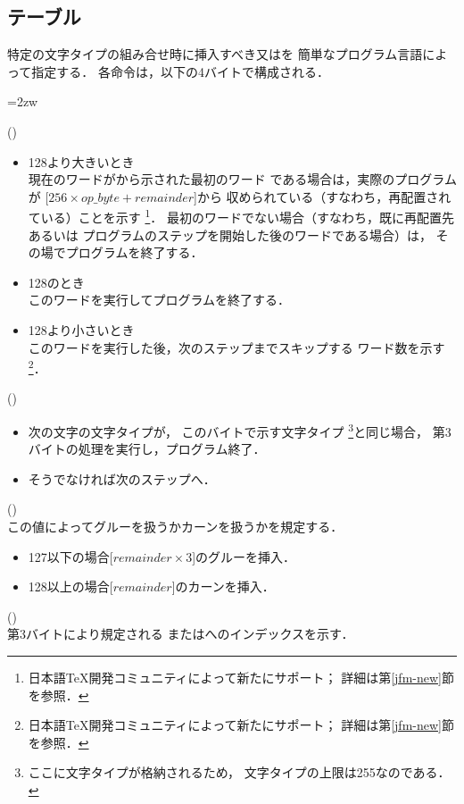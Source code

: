 \documentclass[a4paper,11pt,nomag]{jsarticle}
\def\size#1{\mathit{#1}}
\begin{document}

\subsection{テーブル}
特定の文字タイプの組み合せ時に挿入すべき又はを
簡単なプログラム言語によって指定する．
各命令は，以下の4バイトで構成される．
\begin{description}\itemindent=2zw
\item[第1バイト] ()
  \begin{itemize}
  \item 128より大きいとき\\
    現在のワードがから示された最初のワード
    である場合は，実際のプログラムが
    [$256\times\size{op\_byte}+\size{remainder}$]から
    収められている（すなわち，再配置されている）ことを示す
    \footnote{日本語\TeX{}開発コミュニティによって新たにサポート；
    詳細は第\ref{jfm-new}節を参照．}．
    最初のワードでない場合（すなわち，既に再配置先あるいは
    プログラムのステップを開始した後のワードである場合）は，
    その場でプログラムを終了する．
  \item 128のとき\\
    このワードを実行してプログラムを終了する．
  \item 128より小さいとき\\
    このワードを実行した後，次のステップまでスキップする
    ワード数を示す
    \footnote{日本語\TeX{}開発コミュニティによって新たにサポート；
    詳細は第\ref{jfm-new}節を参照．}．
  \end{itemize}
\item[第2バイト] ()
  \begin{itemize}
  \item 次の文字の文字タイプが，
    このバイトで示す文字タイプ
    \footnote{ここに文字タイプが格納されるため，
    文字タイプの上限は255なのである．}と同じ場合，
    第3バイトの処理を実行し，プログラム終了．
  \item そうでなければ次のステップへ．
  \end{itemize}
\item[第3バイト] ()\\
  この値によってグルーを扱うかカーンを扱うかを規定する．
  \begin{itemize}
  \item 127以下の場合[$\size{remainder}\times 3$]のグルーを挿入．
  \item 128以上の場合[$\size{remainder}$]のカーンを挿入．
  \end{itemize}
\item[第4バイト] ()\\
  第3バイトにより規定される
  またはへのインデックスを示す．
\end{description}
\end{document}
